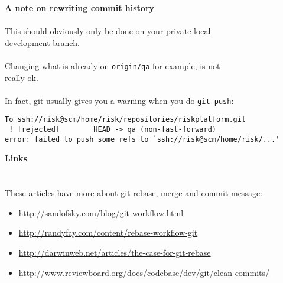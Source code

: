 \documentclass[landscape]{slides}
\begin{document}
\begin{slide}
\textbf{A note on rewriting commit history}\\
\\
This should obviously only be done on your private local\\ development branch.\\
\\
Changing what is already on {\tt origin/qa} for example, is not\\ really ok.\\
\\
In fact, git usually gives you a warning when you do {\tt git push}:\\
\vspace{-15mm}
\begin{verbatim}
To ssh://risk@scm/home/risk/repositories/riskplatform.git
 ! [rejected]        HEAD -> qa (non-fast-forward)
error: failed to push some refs to `ssh://risk@scm/home/risk/...'
\end{verbatim}
\end{slide}

\begin{slide}
\textbf{Links}\\
\\
\\
These articles have more about git rebase, merge and commit message:
\vspace{-8mm}
\begin{itemize}
\item {\small \url{http://sandofsky.com/blog/git-workflow.html}}
\vspace{-10mm}
\item {\small \url{http://randyfay.com/content/rebase-workflow-git}}
\vspace{-10mm}
\item {\small \url{http://darwinweb.net/articles/the-case-for-git-rebase}}
\vspace{-10mm}
\item {\small \url{http://www.reviewboard.org/docs/codebase/dev/git/clean-commits/}}
\end{itemize}
\end{slide}
\end{document}
